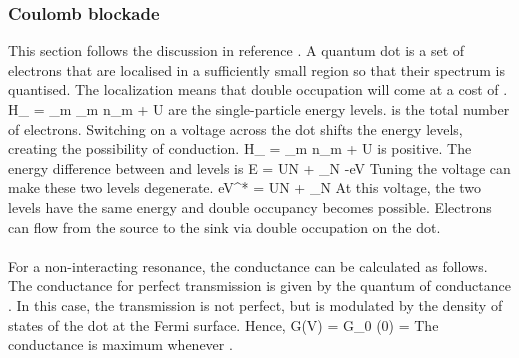 \documentclass[12pt,twoside]{article}
\numberwithin{equation}{section}
\begin{document}
\subsubsection{Coulomb blockade}
This section follows the discussion in reference \cite{piers}. A quantum dot is a set of electrons that are localised in a sufficiently small region so that their spectrum is quantised.
The localization means that double occupation will come at a cost of .
\beq
H_ = \sum_{m\sigma} \epsilon_m n_{m\sigma} + U
\eeq
{} are the single-particle energy levels.
 is the total number of electrons.
 Switching on a voltage  across the dot shifts the energy levels, creating the possibility of conduction.
\beq
H_ = \sum_{m\sigma}  n_{m\sigma} + U
\eeq
{} is positive.
The energy difference between  and  levels is
\beq
\Delta E = UN + \epsilon_{N} -eV
\eeq
Tuning the voltage can make these two levels degenerate.
\beq
eV^* = UN + \epsilon_{N}
\eeq
At this voltage, the two levels have the same energy and double occupancy becomes possible.
Electrons can flow from the source to the sink via double occupation on the dot.\\\\
For a non-interacting resonance, the conductance can be calculated as follows.
The conductance for perfect transmission is given by the quantum of conductance .
In this case, the transmission is not perfect, but is modulated by the density of states of the dot at the Fermi surface.
Hence,
\beq
G(V) = G_0 \rho(0) =  
\eeq
The conductance is maximum whenever .
\end{document}
